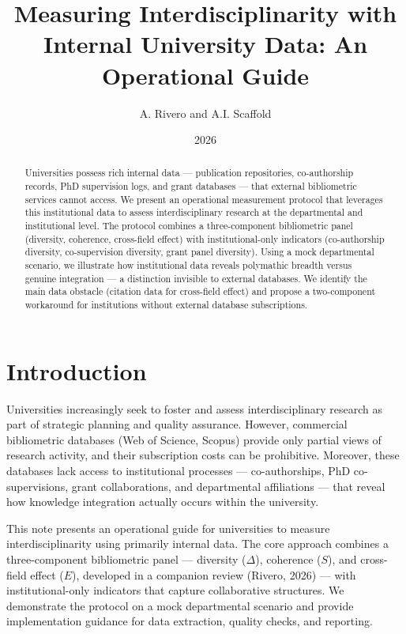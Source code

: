 \documentclass[
]{article}
\title{Measuring Interdisciplinarity with Internal University Data: An
Operational Guide}
\author{A. Rivero and A.I. Scaffold}
\date{2026}
\begin{document}
\maketitle
\begin{abstract}
Universities possess rich internal data --- publication repositories,
co-authorship records, PhD supervision logs, and grant databases ---
that external bibliometric services cannot access. We present an
operational measurement protocol that leverages this institutional data
to assess interdisciplinary research at the departmental and
institutional level. The protocol combines a three-component
bibliometric panel (diversity, coherence, cross-field effect) with
institutional-only indicators (co-authorship diversity, co-supervision
diversity, grant panel diversity). Using a mock departmental scenario,
we illustrate how institutional data reveals polymathic breadth versus
genuine integration --- a distinction invisible to external databases.
We identify the main data obstacle (citation data for cross-field
effect) and propose a two-component workaround for institutions without
external database subscriptions.
\end{abstract}

\hypertarget{introduction}{%
\section{Introduction}\label{introduction}}

Universities increasingly seek to foster and assess interdisciplinary
research as part of strategic planning and quality assurance. However,
commercial bibliometric databases (Web of Science, Scopus) provide only
partial views of research activity, and their subscription costs can be
prohibitive. Moreover, these databases lack access to institutional
processes --- co-authorships, PhD co-supervisions, grant collaborations,
and departmental affiliations --- that reveal how knowledge integration
actually occurs within the university.

This note presents an operational guide for universities to measure
interdisciplinarity using primarily internal data. The core approach
combines a three-component bibliometric panel --- diversity
(\(\Delta\)), coherence (\(S\)), and cross-field effect (\(E\)),
developed in a companion review (Rivero, 2026) --- with
institutional-only indicators that capture collaborative structures. We
demonstrate the protocol on a mock departmental scenario and provide
implementation guidance for data extraction, quality checks, and
reporting.
\end{document}
